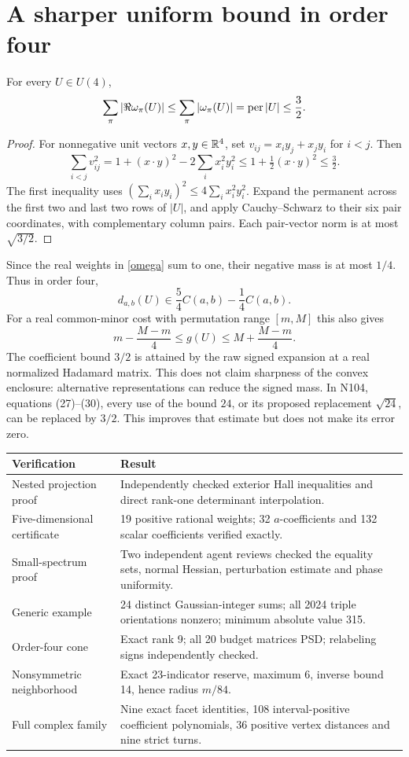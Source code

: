 \documentclass[11pt]{article}
\begin{document}
\section{A sharper uniform bound in order four}
\begin{proposition}
For every $U\in U(4)$,
\[
\sum_\pi|\Re\omega_\pi(U)|\le\sum_\pi|\omega_\pi(U)|=\operatorname{per}|U|\le\frac32.
\]
\end{proposition}
\begin{proof}
For nonnegative unit vectors $x,y\in\mathbb R^4$, set $v_{ij}=x_i y_j+x_j y_i$ for $i<j$. Then
\[
\sum_{i<j}v_{ij}^2=1+(x\cdot y)^2-2\sum_i x_i^2y_i^2
\le1+\tfrac12(x\cdot y)^2\le\tfrac32.
\]
The first inequality uses $(\sum_i x_i y_i)^2\le4\sum_i x_i^2y_i^2$. Expand the permanent across the first two and last two rows of $|U|$, and apply Cauchy--Schwarz to their six pair coordinates, with complementary column pairs. Each pair-vector norm is at most $\sqrt{3/2}$.
\end{proof}

Since the real weights in \eqref{omega} sum to one, their negative mass is at most $1/4$. Thus in order four,
\[
d_{a,b}(U)\in\frac54 C(a,b)-\frac14 C(a,b).
\]
For a real common-minor cost with permutation range $[m,M]$ this also gives
\[
m-\frac{M-m}{4}\le g(U)\le M+\frac{M-m}{4}.
\]
The coefficient bound $3/2$ is attained by the raw signed expansion at a real normalized Hadamard matrix. This does not claim sharpness of the convex enclosure: alternative representations can reduce the signed mass. In N104, equations (27)--(30), every use of the bound $24$, or its proposed replacement $\sqrt{24}$, can be replaced by $3/2$. This improves that estimate but does not make its error zero.


\begin{center}\begin{tabular}{p{}p{}}
\toprule Verification & Result \\\midrule
Nested projection proof & Independently checked exterior Hall inequalities and direct rank-one determinant interpolation.\\
Five-dimensional certificate & 19 positive rational weights; 32 $a$-coefficients and 132 scalar coefficients verified exactly.\\
Small-spectrum proof & Two independent agent reviews checked the equality sets, normal Hessian, perturbation estimate and phase uniformity.\\
Generic example & 24 distinct Gaussian-integer sums; all 2024 triple orientations nonzero; minimum absolute value 315.\\
Order-four cone & Exact rank 9; all 20 budget matrices PSD; relabeling signs independently checked.\\
Nonsymmetric neighborhood & Exact 23-indicator reserve, maximum 6, inverse bound 14, hence radius $m/84$.\\
Full complex family & Nine exact facet identities, 108 interval-positive coefficient polynomials, 36 positive vertex distances and nine strict turns.\\\bottomrule
\end{tabular}\end{center}
\end{document}
